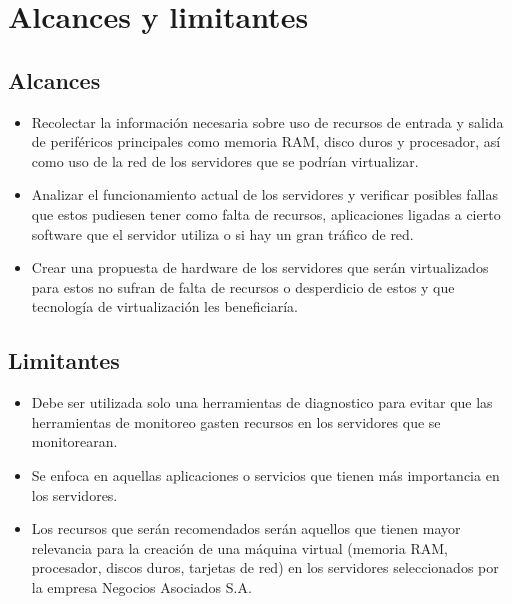 \pagebreak

\section{Alcances y limitantes}

\subsection{Alcances}

\begin{itemize}
\item Recolectar la información necesaria sobre uso de recursos de entrada y salida de periféricos principales como memoria RAM, disco duros y procesador, así como uso de la red de los servidores que se podrían virtualizar.

\item Analizar el funcionamiento actual de los servidores y verificar posibles fallas que estos pudiesen tener como falta de recursos, aplicaciones ligadas a cierto software que el servidor utiliza o si hay un gran tráfico de red.

\item Crear una propuesta de hardware de los servidores que serán virtualizados para estos no sufran de falta de recursos o desperdicio de estos y que tecnología de virtualización les beneficiaría.
\end{itemize}

\subsection{Limitantes}

\begin{itemize}
\item Debe ser utilizada solo una herramientas de diagnostico para evitar que las herramientas de monitoreo gasten recursos en los servidores que se monitorearan.

\item Se enfoca en aquellas aplicaciones o servicios que tienen más importancia en los servidores.

\item Los recursos que serán recomendados serán aquellos que tienen
  mayor relevancia para la creación de una máquina virtual (memoria RAM, procesador, discos duros, tarjetas de red) en los servidores seleccionados por la empresa Negocios Asociados S.A.
\end{itemize}

